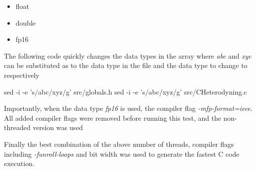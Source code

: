 \begin{itemize}
 \item float
 \item double
 \item \textunderscore \textunderscore fp16
\end{itemize}

The following code quickly changes the data types in the array where \textit{abc} and \textit{xyc} can be substituted as to the data type in the file and the data type to change to respectively

\begin{Cpp}
 sed -i -e 's/abc/xyz/g' src/globals.h
 sed -i -e 's/abc/xyz/g' src/CHeterodyning.c
\end{Cpp}

Importantly, when the data type \textit{\textunderscore \textunderscore fp16} is used, the compiler flag \textit{-mfp-format=ieee}.
All added compiler flags were removed before running this test, and the non-threaded version was used

\newline
Finally the best combination of the above number of threads, compiler flags including \textit{-funroll-loops} and bit width was used to generate the fastest C code execution.